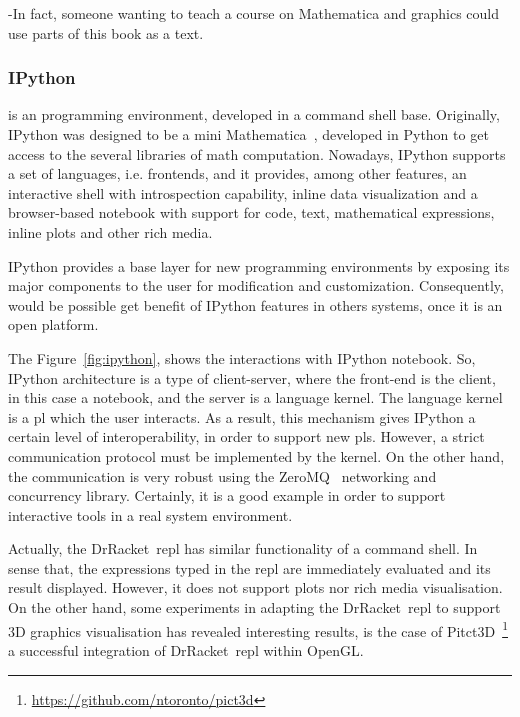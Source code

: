 -In fact, someone wanting to teach a course on Mathematica and graphics could use parts of this book as a text.

\subsubsection{IPython~\cite{PER-GRA:2007}} is an programming environment, developed in a command shell base. Originally, IPython was designed to be a mini Mathematica~\cite{wolfram1991mathematica}, developed in Python to get access to the several libraries of math computation. Nowadays, IPython supports a set of languages, i.e. frontends, and it provides, among other features, an interactive shell with introspection capability, inline data visualization and a browser-based notebook with support for code, text, mathematical expressions, inline plots and other rich media. 

IPython provides a base layer for new programming environments by exposing its major components to the user for modification and customization. Consequently, would be possible get benefit of IPython features in others systems, once it is an open platform.  

The Figure~\ref{fig:ipython}, shows the interactions with IPython notebook. So, IPython architecture is a type of client-server, where the front-end is the client, in this case a notebook, and the server is a language kernel. The language kernel is a \ac{pl} which the user interacts. As a result, this mechanism gives IPython a certain level of interoperability, in order to support new \ac{pl}s. However, a strict communication protocol must be implemented by the kernel. On the other hand, the communication is very robust using the ZeroMQ~\cite{hintjens2013zeromq} networking and concurrency library. Certainly, it is a good example in order to support interactive tools in a real system environment.

Actually, the DrRacket~\ac{repl} has similar functionality of a command shell. In sense that, the expressions typed in the \ac{repl} are immediately evaluated and its result displayed. However, it does not support plots nor rich media visualisation. On the other hand, some experiments in adapting the DrRacket~\ac{repl} to support 3D graphics visualisation has revealed interesting results, is the case of Pitct3D~\footnote{\url{https://github.com/ntoronto/pict3d}} a successful integration of DrRacket~\ac{repl} within OpenGL.

